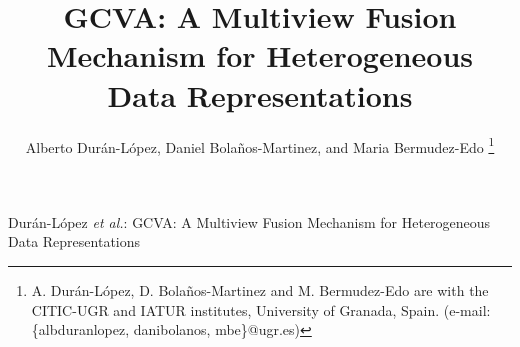 \documentclass[journal]{IEEEtran}
\begin{document}
%
\title{GCVA: A Multiview Fusion Mechanism for Heterogeneous Data Representations}
%
%
%

\author{Alberto Durán-López, Daniel Bolaños-Martinez, and Maria Bermudez-Edo%
\thanks{A. Durán-López, D. Bolaños-Martinez and M. Bermudez-Edo are with the CITIC-UGR and IATUR institutes, University of Granada, Spain. (e-mail: \{albduranlopez, danibolanos, mbe\}@ugr.es)}%
}

%
{Durán-López \MakeLowercase{\textit{et al.}}: GCVA: A Multiview Fusion Mechanism for Heterogeneous  Data Representations}


% 








\maketitle
\end{document}
